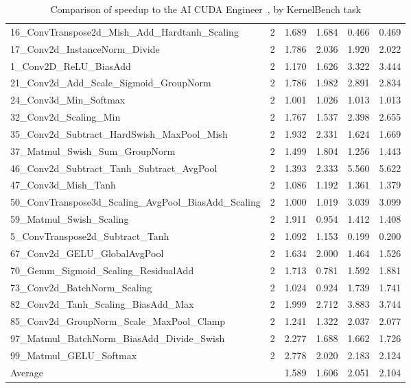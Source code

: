 \begin{table}[b!ht]
{\begin{tabular}{lrrrrr}
\midrule
16\_ConvTranspose2d\_Mish\_Add\_Hardtanh\_Scaling & 2 & 1.689 & 1.684 & 0.466 & 0.469 \\
17\_Conv2d\_InstanceNorm\_Divide & 2 & 1.786 & 2.036 & 1.920 & 2.022 \\
1\_Conv2D\_ReLU\_BiasAdd & 2 & 1.170 & 1.626 & 3.322 & 3.444 \\
21\_Conv2d\_Add\_Scale\_Sigmoid\_GroupNorm & 2 & 1.786 & 1.982 & 2.891 & 2.834 \\
24\_Conv3d\_Min\_Softmax & 2 & 1.001 & 1.026 & 1.013 & 1.013 \\
32\_Conv2d\_Scaling\_Min & 2 & 1.767 & 1.537 & 2.398 & 2.655 \\
35\_Conv2d\_Subtract\_HardSwish\_MaxPool\_Mish & 2 & 1.932 & 2.331 & 1.624 & 1.669 \\
37\_Matmul\_Swish\_Sum\_GroupNorm & 2 & 1.499 & 1.804 & 1.256 & 1.443 \\
46\_Conv2d\_Subtract\_Tanh\_Subtract\_AvgPool & 2 & 1.393 & 2.333 & 5.560 & 5.622 \\
47\_Conv3d\_Mish\_Tanh & 2 & 1.086 & 1.192 & 1.361 & 1.379 \\
50\_ConvTranspose3d\_Scaling\_AvgPool\_BiasAdd\_Scaling & 2 & 1.000 & 1.019 & 3.039 & 3.099 \\
59\_Matmul\_Swish\_Scaling & 2 & 1.911 & 0.954 & 1.412 & 1.408 \\
5\_ConvTranspose2d\_Subtract\_Tanh & 2 & 1.092 & 1.153 & 0.199 & 0.200 \\
67\_Conv2d\_GELU\_GlobalAvgPool & 2 & 1.634 & 2.000 & 1.464 & 1.526 \\
70\_Gemm\_Sigmoid\_Scaling\_ResidualAdd & 2 & 1.713 & 0.781 & 1.592 & 1.881 \\
73\_Conv2d\_BatchNorm\_Scaling & 2 & 1.024 & 0.924 & 1.739 & 1.741 \\
82\_Conv2d\_Tanh\_Scaling\_BiasAdd\_Max & 2 & 1.999 & 2.712 & 3.883 & 3.744 \\
85\_Conv2d\_GroupNorm\_Scale\_MaxPool\_Clamp & 2 & 1.241 & 1.322 & 2.037 & 2.077 \\
97\_Matmul\_BatchNorm\_BiasAdd\_Divide\_Swish & 2 & 2.277 & 1.688 & 1.662 & 1.726 \\
99\_Matmul\_GELU\_Softmax & 2 & 2.778 & 2.020 & 2.183 & 2.124 \\
\midrule
Average &  & 1.589 & 1.606 & 2.051 & 2.104 \\
\bottomrule
\end{tabular}

    }
\caption{Comparison of speedup to the AI CUDA Engineer~\cite{lange2025ai}, by KernelBench task}
\label{tab:aicudaengineer_by_task}
\end{table}

